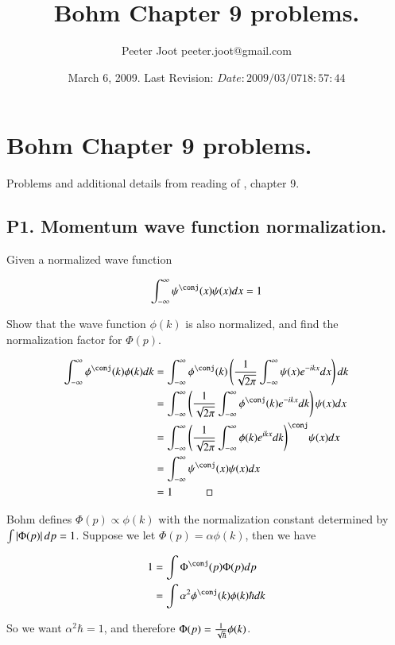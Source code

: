 \documentclass{article}
\title{ Bohm Chapter 9 problems. }
\author{Peeter Joot \quad peeter.joot@gmail.com }
\date{ March 6, 2009.  Last Revision: $Date: 2009/03/07 18:57:44 $ }
\newcommand{\IIinf}[0]{ \int_{-\infty}^\infty }
\begin{document}
\maketitle{}

\tableofcontents

\section{ Bohm Chapter 9 problems. }

Problems and additional details from reading of \cite{bohm1989qt}, chapter 9.

\subsection{ P1. Momentum wave function normalization. }

Given a normalized wave function

\begin{align*}
\IIinf \psi^\conj(x) \psi(x) dx = 1
\end{align*}

Show that the wave function $\phi(k)$ is also normalized, and find the normalization factor for $\Phi(p)$.

\begin{align*}
\IIinf \phi^\conj(k) \phi(k) dk 
&= 
\IIinf \phi^\conj(k) \left( \inv{\sqrt{2\pi}} \IIinf \psi(x) e^{-i k x} dx \right) dk  \\
&= 
\IIinf \left( \inv{\sqrt{2\pi}} \IIinf \phi^\conj(k) e^{-i k x} dk \right) \psi(x) dx  \\
&= 
\IIinf {\left( \inv{\sqrt{2\pi}} \IIinf \phi(k) e^{i k x} dk \right)}^\conj \psi(x) dx  \\
&= 
\IIinf \psi^\conj(x) \psi(x) dx  \\
&= 1 \quad\quad\quad \square
\end{align*}

Bohm defines $\Phi(p) \propto \phi(k)$ with the normalization constant determined by $\int \left\lvert{\Phi(p)}\right\rvert dp = 1$.  Suppose we 
let $\Phi(p) = \alpha \phi(k)$, then we have

\begin{align*}
1 
&= \int \Phi^\conj(p) \Phi(p) dp \\
&= \int \alpha^2 \phi^\conj(k) \phi(k) \hbar d k
\end{align*}

So we want $\alpha^2 \hbar = 1$, and therefore $\Phi(p) = \frac{1}{\sqrt{\hbar}} \phi(k)$.
\end{document}
